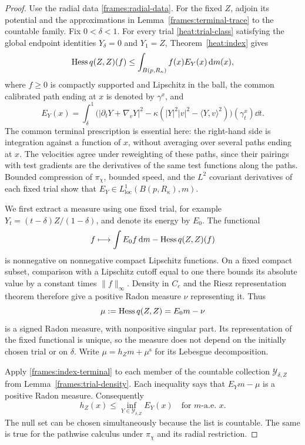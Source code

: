 \begin{proof}
 Use the radial data \eqref{frames:radial-data}.
 For the fixed $Z$, adjoin its potential and the approximations
 in Lemma~\ref{frames:terminal-trace} to the countable family.
 Fix $0<\delta<1$.  For every trial \eqref{heat:trial-class}
 satisfying the global endpoint identities $Y_\delta=0$ and $Y_1=Z$,
 Theorem~\ref{heat:index} gives
 \begin{equation}\label{frames:index-terminal}
  \operatorname{Hess} q(Z,Z)(f)\leq\int_{B(p,R_\kappa)} f(x)E_Y(x)\,\mathrm d m(x),
 \end{equation}
 where $f\geq0$ is compactly supported and Lipschitz in the ball,
 the common calibrated path ending at $x$ is denoted by
 $\gamma^x$, and
 \begin{equation}\label{frames:trial-energy}
  E_Y(x)=\int_\delta^1
    \bigl(|\partial_tY+\nabla_vY|^2
                   -\kappa(|Y|^2|v|^2-\langle Y,v\rangle^2)
    \bigr)(\gamma^x_t)\dd t.
 \end{equation}
 The common terminal prescription is essential here: the
 right-hand side is integration against a function of $x$,
 without averaging over several paths ending at $x$.
 The velocities agree under reweighting of these paths, since
 their pairings with test gradients are the derivatives of
 the same test functions along the paths.
 Bounded compression of $\pi_\chi$, bounded speed, and the
 $L^2$ covariant derivatives of each fixed trial show that
 $E_Y\in L^1_{\mathrm{loc}}(B(p,R_\kappa),m)$.

 We first extract a measure using one fixed trial, for example
 $Y_t=(t-\delta)Z/(1-\delta)$, and denote its energy by $E_0$.
 The functional
 \[
  f\longmapsto\int E_0 f\,\mathrm d m-\operatorname{Hess} q(Z,Z)(f)
 \]
 is nonnegative on nonnegative compact Lipschitz functions.
 On a fixed compact subset, comparison with a Lipschitz cutoff
 equal to one there bounds its absolute value by a constant
 times $\|f\|_\infty$.  Density in $C_c$ and the Riesz
 representation theorem therefore give a positive Radon
 measure $\nu$ representing it.  Thus
 \[
  \mu:=\operatorname{Hess} q(Z,Z)=E_0m-\nu
 \]
 is a signed Radon measure, with nonpositive singular part.
 Its representation of the fixed functional is unique, so
 the measure does not depend on the initially chosen trial
 or on $\delta$.
 Write $\mu=h_Zm+\mu^{\mathrm s}$ for its Lebesgue decomposition.

 Apply \eqref{frames:index-terminal} to each member of the
 countable collection $\mathcal Y_{\delta,Z}$ from
 Lemma~\ref{frames:trial-density}.  Each inequality says that
 $E_Ym-\mu$ is a positive Radon measure.  Consequently
 \begin{equation}\label{frames:countable-infimum}
  h_Z(x)\leq\inf_{Y\in\mathcal Y_{\delta,Z}}E_Y(x)
                                      \quad\text{for }m\text{-a.e. }x.
 \end{equation}
 The null set can be chosen simultaneously because the list
 is countable.  The same is true for the pathwise calculus
 under $\pi_\chi$ and its radial restriction.


\end{proof}
